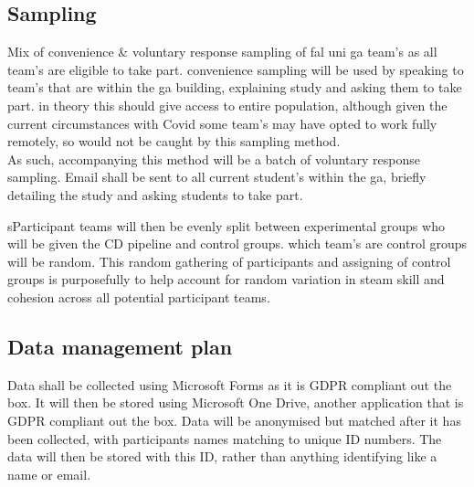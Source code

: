 \documentclass[lettersize,journal]{IEEEtran}
\begin{document}
    \subsection{Sampling}
        Mix of convenience \& voluntary response sampling of fal uni ga team's as all team's are eligible to take part. convenience sampling will be used by speaking to team's that are within the ga building, explaining study and asking them to take part. in theory this should give access to entire population, although given the current circumstances with Covid \cite{bbcomicron} some team's may have opted to work fully remotely, so would not be caught by this sampling method.\\
        As such, accompanying this method will be a batch of voluntary response sampling. Email shall be sent to all current student's within the ga, briefly detailing the study and asking students to take part. 

        sParticipant teams will then be evenly split between experimental groups who will be given the CD pipeline and control groups. which team's are control groups will be random. This random gathering of participants and assigning of control groups is purposefully to help account for random variation in steam skill and cohesion across all potential participant teams.
        
    \subsection{Data management plan}
        Data shall be collected using Microsoft Forms as it is GDPR compliant out the box. It will then be stored using Microsoft One Drive, another application that is GDPR compliant out the box.
        Data will be anonymised but matched after it has been collected, with participants names matching to unique ID numbers. The data will then be stored with this ID, rather than anything identifying like a name or email.
    
\end{document}
